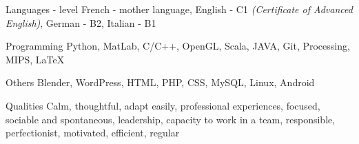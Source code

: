 

\begin{cvskills}

\cvskill
    {Languages - level} %
    {French - mother language, English - C1 \textit{(Certificate of Advanced English)},  German - B2, Italian - B1} %

  \cvskill
    {Programming} %
    {Python, MatLab, C/C++, OpenGL, Scala, JAVA, Git, Processing, MIPS, LaTeX} %

  \cvskill
    {Others} %
    {Blender, WordPress, HTML, PHP, CSS, MySQL, Linux, Android} %

\cvskill
{Qualities}
{Calm, thoughtful, adapt easily, professional experiences, focused, sociable and spontaneous, leadership, \newline capacity to work in a team, responsible, perfectionist, motivated, efficient, regular}
  
\end{cvskills}
